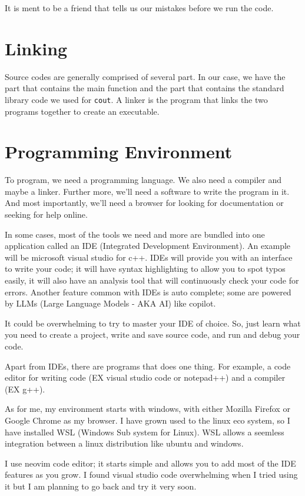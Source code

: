 \documentclass{book}
\begin{document}
It is ment to be a friend that tells us our mistakes before we run the code.

\section{Linking}
Source codes are generally comprised of several part. In our case, we have the part that contains the main function and the part that contains the standard library code we used for \verb|cout|. A linker is the program that links the two programs together to create an executable.

\section{Programming Environment}
To program, we need a programming language. We also need a compiler and maybe a linker. Further more, we'll need a software to write the program in it. And most importantly, we'll need a browser for looking for documentation or seeking for help online.

In some cases, most of the tools we need and more are bundled into one application called an IDE (Integrated Development Environment). An example will be microsoft visual studio for c++. IDEs will provide you with an interface to write your code; it will have syntax highlighting to allow you to spot typos easily, it will also have an analysis tool that will continuously check your code for errors. Another feature common with IDEs is auto complete; some are powered by LLMs (Large Language Models - AKA AI) like copilot.

It could be overwhelming to try to master your IDE of choice. So, just learn what you need to create a project, write and save source code, and run and debug your code.

Apart from IDEs, there are programs that does one thing. For example, a code editor for writing code (EX visual studio code or notepad++) and a compiler (EX g++).

As for me, my environment starts with windows, with either Mozilla Firefox or Google Chrome as my browser. I have grown used to the linux eco system, so I have installed WSL (Windows Sub system for Linux). WSL allows a seemless integration between a linux distribution like ubuntu and windows.

I use neovim code editor; it starts simple and allows you to add most of the IDE features as you grow. I found visual studio code overwhelming when I tried using it but I am planning to go back and try it very soon.
\end{document}
